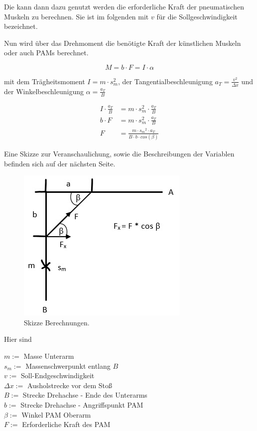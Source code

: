 		Die kann dann dazu genutzt werden die erforderliche Kraft der pneumatischen Muskeln zu berechnen.
		Sie ist im folgenden mit \(v\) für die Sollgeschwindigkeit bezeichnet. \par
		Nun wird über das Drehmoment die benötigte Kraft der künstlichen Muskeln oder auch PAMs berechnet. 



		\begin{equation}
			M = b \cdot F = I \cdot \alpha%
			\label{eq:DrehmomentArm}
		\end{equation}

		mit dem Trägheitsmoment \( I = m \cdot s_m^2 \), der Tangentialbeschleunigung \( a_T = \frac{v^2}{\Delta x} \) und der
		Winkelbeschleunigung \( \alpha = \frac{a_T}{B} \) \par\medskip

		\begin{align}
			I \cdot \frac{a_T}{B} &= m \cdot s_m^2 \cdot \frac{a_T}{B} \nonumber\\
			b \cdot F &= m \cdot s_m^2 \cdot \frac{a_T}{B} \nonumber\\
			F &=\frac{m \cdot {s_m}^2 \cdot a_T}{B \cdot b \cdot cos(\beta)}%
			\label{eq:Kraft-PAM}
		\end{align}

		Eine Skizze zur Veranschaulichung, sowie die Beschreibungen der Variablen befinden sich auf der nächsten Seite. 

		\newpage
		\begin{figure}[h]
			\centering
			\includegraphics[width=.5\textwidth]{Abb/SkizzeBerechnungen.jpeg}
			\caption{Skizze Berechnungen.}%
			\label{fig:SkizzeBerechnungen}
		\end{figure}

		Hier sind

		\( m := \) Masse Unterarm \\
		\( s_m := \) Massenschwerpunkt entlang $ B $ \\
		\( v := \) Soll-Endgeschwindigkeit \\
		\( \Delta x := \) Ausholstrecke vor dem Stoß \\
		\( B := \) Strecke Drehachse - Ende des Unterarms \\
		\( b:= \) Strecke Drehachse - Angriffspunkt PAM \\
		\( \beta := \) Winkel PAM  Oberarm \\
		\( F:= \) Erforderliche Kraft des PAM

